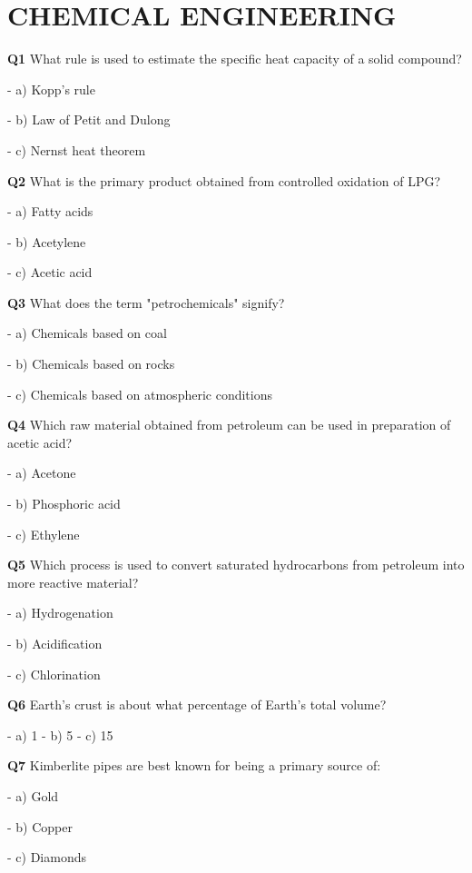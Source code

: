 \section{CHEMICAL ENGINEERING}

\textbf{Q1} What rule is used to estimate the specific heat capacity of a solid compound?\par
\quad - a) Kopp's rule\par
\quad - b) Law of Petit and Dulong\par
\quad - c) Nernst heat theorem\par

\textbf{Q2} What is the primary product obtained from controlled oxidation of LPG?\par
\quad - a) Fatty acids\par
\quad - b) Acetylene\par
\quad - c) Acetic acid\par

\textbf{Q3} What does the term "petrochemicals" signify?\par
\quad - a) Chemicals based on coal\par
\quad - b) Chemicals based on rocks\par
\quad - c) Chemicals based on atmospheric conditions\par

\textbf{Q4} Which raw material obtained from petroleum can be used in preparation of acetic acid?\par
\quad - a) Acetone\par
\quad - b) Phosphoric acid\par
\quad - c) Ethylene\par

\textbf{Q5} Which process is used to convert saturated hydrocarbons from petroleum into more reactive material?\par
\quad - a) Hydrogenation\par
\quad - b) Acidification\par
\quad - c) Chlorination\par

\textbf{Q6} Earth's crust is about what percentage of Earth's total volume?\par
\quad - a) 1%
\quad - b) 5%
\quad - c) 15%

\textbf{Q7} Kimberlite pipes are best known for being a primary source of:\par
\quad - a) Gold\par
\quad - b) Copper\par
\quad - c) Diamonds\par

